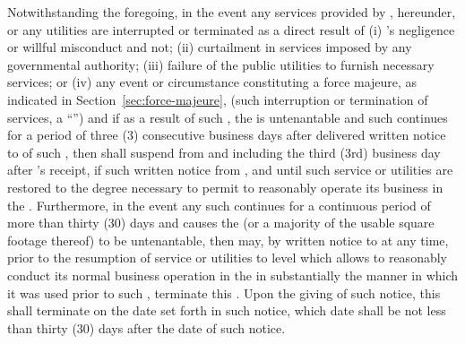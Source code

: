 Notwithstanding the foregoing, in the event any services provided by \lessor, hereunder, or any utilities are interrupted or terminated as a direct result of (i) \lessor's negligence or willful misconduct and not; (ii) curtailment in services imposed by any governmental authority; (iii) failure of the public utilities to furnish necessary services; or (iv) any event or circumstance constituting a force majeure, as indicated in Section~\ref{sec:force-majeure}, (such interruption or termination of services, a ``'') and if as a result of such \serviceInterruption, the \premises is untenantable and such \serviceInterruption continues for a period of three (3) consecutive business days after \lessee delivered written notice to \lessor of such \serviceInterruption, then \monthlyRent shall suspend from and including the third (3rd) business day after \lessor's receipt, if such written notice from \lessee, and until such service or utilities are restored to the degree necessary to permit \lessee to reasonably operate its business in the \premises. Furthermore, in the event any such \serviceInterruption continues for a continuous period of more than thirty (30) days and causes the \premises (or a majority of the usable square footage thereof) to be untenantable, then \lessee may, by written notice to \lessor at any time, prior to the resumption of service or utilities to level which allows \lessee to reasonably conduct its normal business operation in the \premises in substantially the manner in which it was used prior to such \serviceInterruption, terminate this \lease. Upon the giving of such notice, this \lease shall terminate on the date set forth in such notice, which date shall be not less than thirty (30) days after the date of such notice.
